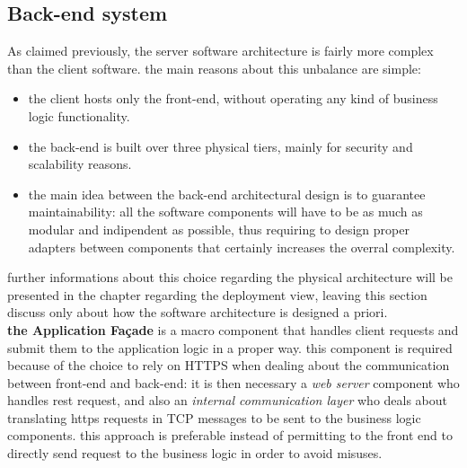 \subsection{Back-end system}
As claimed previously, the server software architecture is fairly more complex than the client software. the main reasons about this unbalance are simple:
\begin{itemize}
    \item the client hosts only the front-end, without operating any kind of business logic functionality.
    \item the back-end is built over three physical tiers, mainly for security and scalability reasons.
    \item the main idea between the back-end architectural design is to guarantee maintainability: all the software components will have to be as much as 
          modular and indipendent as possible, thus requiring to design proper adapters between components that certainly increases the overral complexity.
\end{itemize}

further informations about this choice regarding the physical architecture will be presented in the chapter regarding the deployment view, leaving this section
discuss only about how the software architecture is designed a priori. \\

\textbf{the Application Façade} 
        is a macro component that handles client requests and submit them to the application logic in a proper way. this component is required because
        of the choice to rely on HTTPS when dealing about the communication between front-end and back-end: it is then necessary a \emph{web server} component who handles
        rest request, and also an \emph{internal communication layer} who deals about translating https requests in TCP messages to be sent to the business logic components.
        this approach is preferable instead of permitting to the front end to directly send request to the business logic in order to avoid misuses. \\
        
